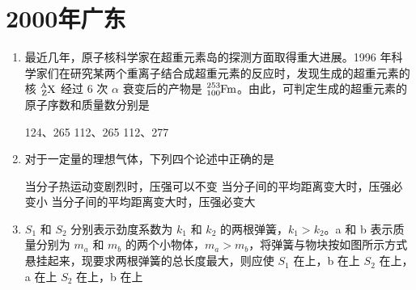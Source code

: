 \documentclass[\gkver]{gaokaozhenti}
\begin{document}
\chapter{2000年广东}

\begin{enumerate}
\item
最近几年，原子核科学家在超重元素岛的探测方面取得重大进展。1996 年科学家们在研究某两个重离子结合成超重元素的反应时，发现生成的超重元素的核 $\ce{^{A}_{Z}X}$ 经过 6 次 $\alpha$ 衰变后的产物是 $\ce{^{253}_{100}Fm}$。由此，可判定生成的超重元素的原子序数和质量数分别是 

{124、265}
{112、265}
{112、277}


\item
对于一定量的理想气体，下列四个论述中正确的是 

{当分子热运动变剧烈时，压强可以不变}
{当分子间的平均距离变大时，压强必变小}
{当分子间的平均距离变大时，压强必变大}


\item
$S_{1}$ 和 $S_{2}$ 分别表示劲度系数为 $k_{1}$ 和 $k_{2}$ 的两根弹簧，$k_{1} > k_{2}$。a 和 b 表示质量分别为 $m_{a}$ 和 $m_{b}$ 的两个小物体，$m_{a} > m_{b}$，将弹簧与物块按如图所示方式悬挂起来，现要求两根弹簧的总长度最大，则应使 
\onepicture[w=1.71cm]{}
{$S_{1}$ 在上，b 在上}
{$S_{2}$ 在上，a 在上}
{$S_{2}$ 在上，b 在上}


\end{enumerate}
\end{document}
